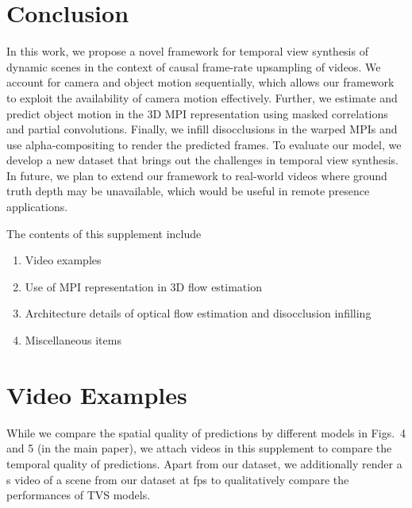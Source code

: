 \documentclass[preprint]{vgtc}
\begin{document}
    \section{Conclusion}\label{sec:conclusion}
    In this work, we propose a novel framework for temporal view synthesis of dynamic scenes in the context of causal frame-rate upsampling of videos.
    We account for camera and object motion sequentially, which allows our framework to exploit the availability of camera motion effectively.
    Further, we estimate and predict object motion in the 3D MPI representation using masked correlations and partial convolutions.
    Finally, we infill disocclusions in the warped MPIs and use alpha-compositing to render the predicted frames.
    To evaluate our model, we develop a new dataset that brings out the challenges in temporal view synthesis.
    In future, we plan to extend our framework to real-world videos where ground truth depth may be unavailable, which would be useful in remote presence applications.




\appendix
{}
    \noindent The contents of this supplement include
    \begin{enumerate}[label=\Alph*., noitemsep]
        \item Video examples
        \item Use of MPI representation in 3D flow estimation
        \item Architecture details of optical flow estimation and disocclusion infilling
        \item Miscellaneous items
    \end{enumerate}

    \section{Video Examples}\label{sec:video-examples}
    While we compare the spatial quality of predictions by different models in Figs.\ 4 and 5 (in the main paper), we attach videos in this supplement to compare the temporal quality of predictions.
    Apart from our dataset, we additionally render a s video of a scene from our dataset at fps to qualitatively compare the performances of TVS models.
\end{document}
